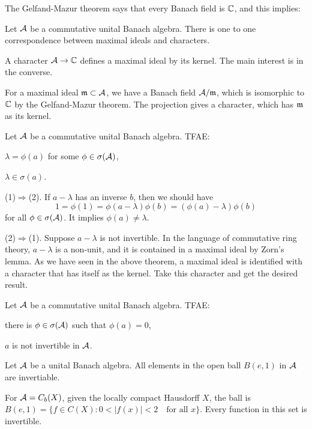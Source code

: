 \documentclass{../crs}
\begin{document}
The Gelfand-Mazur theorem says that every Banach field is $\mathbb{C}$, and this implies:
\begin{thm}
Let $\mathcal{A}$ be a commutative unital Banach algebra.
There is one to one correspondence between maximal ideals and characters.
\end{thm}
\begin{pf}
A character $\cA\to\C$ defines a maximal ideal by its kernel.
The main interest is in the converse.

For a maximal ideal $\mathfrak{m}\subset\mathcal{A}$, we have a Banach field $\mathcal{A}/\mathfrak{m}$, which is isomorphic to $\mathbb{C}$ by the Gelfand-Mazur theorem.
The projection gives a character, which has $\mathfrak{m}$ as its kernel.
\end{pf}

\begin{thm}
Let $\mathcal{A}$ be a commutative unital Banach algebra.
TFAE:
\begin{cond}
\item $\lambda=\phi(a)$ for some $\phi\in\sigma(\mathcal{A})$,
\item $\lambda\in\sigma(a)$.
\end{cond}
\end{thm}
\begin{pf}
(1)$\Rightarrow$(2).
If $a-\lambda$ has an inverse $b$, then we should have
\[1=\phi(1)=\phi(a-\lambda)\phi(b)=(\phi(a)-\lambda)\phi(b)\]
for all $\phi\in\sigma(\mathcal{A})$.
It implies $\phi(a)\ne\lambda$.

(2)$\Rightarrow$(1).
Suppose $a-\lambda$ is not invertible.
In the language of commutative ring theory, $a-\lambda$ is a non-unit, and it is contained in a maximal ideal by Zorn's lemma.
As we have seen in the above theorem, a maximal ideal is identified with a character that has itself as the kernel.
Take this character and get the desired result.
\end{pf}

\begin{cor}
Let $\mathcal{A}$ be a commutative unital Banach algebra.
TFAE:
\begin{cond}
\item there is $\phi\in\sigma(\mathcal{A})$ such that $\phi(a)=0$,
\item $a$ is not invertible in $\mathcal{A}$.
\end{cond}
\end{cor}
\begin{cor}
Let $\mathcal{A}$ be a unital Banach algebra.
All elements in the open ball $B(e,1)$ in $\mathcal{A}$ are invertiable.
\end{cor}
\begin{ex}
For $\mathcal{A}=C_b(X)$, given the locally compact Hausdorff $X$, the ball is $B(e,1)=\{f\in C(X):0<|f(x)|<2\quad\text{for all }x\}$.
Every function in this set is invertible.
\end{ex}
\end{document}
